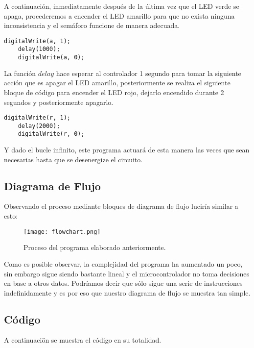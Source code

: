 \documentclass[12pt, letterpaper]{article}
\begin{document}
A continuación, inmediatamente después de la última vez que el LED verde se apaga, procederemos a encender el LED amarillo para que no exista ninguna inconsistencia y el semáforo funcione de manera adecuada.

\begin{lstlisting}[language=Arduino]
	digitalWrite(a, 1);
	delay(1000);
	digitalWrite(a, 0);
\end{lstlisting}

La función $delay$ hace esperar al controlador 1 segundo para tomar la siguiente acción que es apagar el LED amarillo, posteriormente se realiza el siguiente bloque de código para encender el LED rojo, dejarlo encendido durante 2 segundos y posteriormente apagarlo.

\begin{lstlisting}[language=Arduino]
	digitalWrite(r, 1);
	delay(2000);
	digitalWrite(r, 0);
\end{lstlisting}

Y dado el bucle infinito, este programa actuará de esta manera las veces que sean necesarias hasta que se desenergize el circuito.

\subsection*{Diagrama de Flujo}
Observando el proceso mediante bloques de diagrama de flujo luciría similar a esto:

\begin{figure}[H]
	\centering
	\texttt{[image: flowchart.png]}
	\caption{Proceso del programa elaborado anteriormente.}
\end{figure}

Como es posible observar, la complejidad del programa ha aumentado un poco, sin embargo sigue siendo bastante lineal y el microcontrolador no toma decisiones en base a otros datos. Podríamos decir que sólo sigue una serie de instrucciones indefinidamente y es por eso que nuestro diagrama de flujo se muestra tan simple.

\subsection*{Código}
A continuaciön se muestra el código en su totalidad.
\end{document}
